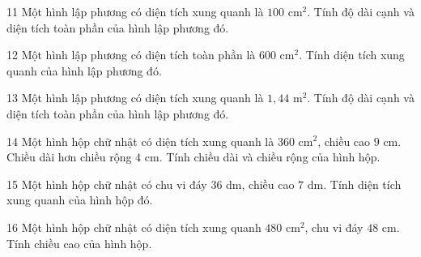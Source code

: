 \gap
\begin{probbox}{11}{\relax}
Một hình lập phương có diện tích xung quanh là $100$ cm$^2$. Tính độ dài cạnh và diện tích toàn phần của hình lập phương đó.
\end{probbox}
\gap
\begin{probbox}{12}{\relax}
Một hình lập phương có diện tích toàn phần là $600$ cm$^2$. Tính diện tích xung quanh của hình lập phương đó.
\end{probbox}
\gap
\begin{probbox}{13}{\relax}
Một hình lập phương có diện tích xung quanh là $1{,}44$ m$^2$. Tính độ dài cạnh và diện tích toàn phần của hình lập phương đó.
\end{probbox}
\gap
\begin{probbox}{14}{\relax}
Một hình hộp chữ nhật có diện tích xung quanh là $360$ cm$^2$, chiều cao $9$ cm. Chiều dài hơn chiều rộng $4$ cm. Tính chiều dài và chiều rộng của hình hộp.
\end{probbox}
\gap
\begin{probbox}{15}{\relax}
Một hình hộp chữ nhật có chu vi đáy $36$ dm, chiều cao $7$ dm. Tính diện tích xung quanh của hình hộp đó.
\end{probbox}
\gap
\begin{probbox}{16}{\relax}
Một hình hộp chữ nhật có diện tích xung quanh $480$ cm$^2$, chu vi đáy $48$ cm. Tính chiều cao của hình hộp.
\end{probbox}
